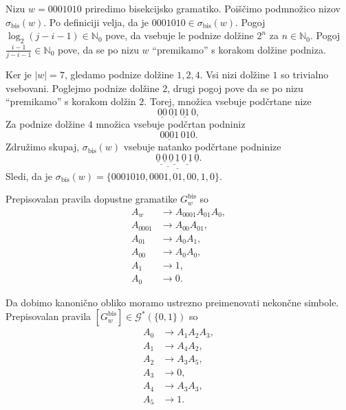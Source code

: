 \documentclass[fin1, tisk]{fmfdelo}
\providecommand{\abs}[1]{\left\lvert #1 \right\rvert}
\newcommand{\N}{\mathbb{N}}
\newcommand{\G}{\mathcal{G}}
\theoremstyle{definition}
\begin{document}
\begin{primer}
    Nizu $w = 0001010$ priredimo bisekcijsko gramatiko. 
    Poiščimo podmnožico nizov $\sigma_{\text{bis}}(w)$. Po definiciji velja, da je 
    $0001010 \in \sigma_{\text{bis}}(w)$.
    Pogoj $\log_2(j-i-1) \in \N_0$ pove, da vsebuje le podnize dolžine $2^n$ za $n \in \N_0$. 
    Pogoj $\frac{i-1}{j-i-1} \in \N_0$ pove, da se po nizu $w$ ``premikamo'' s korakom dolžine 
    podniza.

    Ker je $\abs{w} = 7$, gledamo podnize dolžine $1, 2, 4$. Vsi nizi dolžine $1$ so trivialno
    vsebovani. Poglejmo podnize dolžine $2$, drugi pogoj pove da se po nizu ``premikamo'' s korakom 
    dolžin $2$. Torej, množica vsebuje podčrtane nize
    \[
        \underline{00} \, \underline{01} \, \underline{01} \, 0,
    \]
    Za podnize dolžine $4$ množica vsebuje podčrtan podniniz
    \[
        \underline{0001} \, 010.
    \]
    Združimo skupaj, $\sigma_{\text{bis}}(w)$ vsebuje natanko podčrtane podninize
    \[
        \underline{\underline{\underline{\underline{0} \, \underline{0}} \,
        \underline{\underline{0} \, \underline{1}}} \, \underline{\underline{0} \, \underline{1}}
        \, \underline{0}}.
    \]
    Sledi, da je $\sigma_{\text{bis}}(w) = \{ 0001010, 0001, 01, 00, 1, 0 \}$.

    Prepisovalan pravila dopustne gramatike $G^\text{bis}_w$ so
    \begin{align*}
        A_w &\rightarrow A_{0001}A_{01}A_{0}, \\
        A_{0001} &\rightarrow A_{00}A_{01}, \\
        A_{01} &\rightarrow A_{0}A_{1}, \\
        A_{00} &\rightarrow A_{0}A_{0}, \\
        A_{1} &\rightarrow 1, \\
        A_{0} &\rightarrow 0.
    \end{align*}

    Da dobimo kanonično obliko moramo ustrezno preimenovati nekončne simbole.
    Prepisovalan pravila $[G^\text{bis}_w] \in \G^*(\{ 0, 1 \})$ so
    \begin{align*}
        A_0 &\rightarrow A_1A_2A_3, \\
        A_1 &\rightarrow A_4A_2, \\
        A_2 &\rightarrow A_3A_5, \\
        A_3 &\rightarrow 0, \\
        A_4 &\rightarrow A_3A_3, \\
        A_5 &\rightarrow 1.
    \end{align*}
\end{primer}
\end{document}
